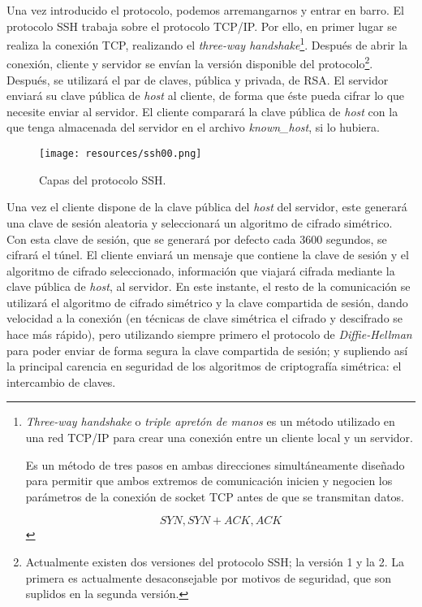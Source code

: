 \documentclass[a4paper, 11pt, titlepage]{article}
\begin{document}
    Una vez introducido el protocolo, podemos arremangarnos y entrar en barro. El protocolo 
    SSH trabaja sobre el protocolo TCP/IP. Por ello, en primer lugar se realiza la conexión 
    TCP, realizando el \textit{three-way handshake}\footnote{
        \textit{Three-way handshake} o \textit{triple apretón de manos} es un método 
        utilizado en una red TCP/IP para crear una conexión entre un cliente local y 
        un servidor.

        Es un método de tres pasos en ambas direcciones simultáneamente diseñado para 
        permitir que ambos extremos de comunicación inicien y negocien los parámetros 
        de la conexión de socket TCP antes de que se transmitan datos.

        \[SYN, SYN+ACK, ACK\]
    }. Después de abrir la conexión, cliente y servidor se envían la versión disponible 
    del protocolo\footnote{
        Actualmente existen dos versiones del protocolo SSH; la versión 1 y la 2. La primera 
        es actualmente desaconsejable por motivos de seguridad, que son suplidos en la segunda 
        versión.
    }. Después, se utilizará el par de claves, pública y privada, de RSA. El servidor enviará 
    su clave pública de \textit{host} al cliente, de forma que éste pueda cifrar lo que necesite 
    enviar al servidor. El cliente comparará la clave pública de \textit{host} con la que 
    tenga almacenada del servidor en el archivo \textit{known\_host}, si lo hubiera. 

    \begin{figure}[htp]
        \centering
        \texttt{[image: resources/ssh00.png]}
        \caption{Capas del protocolo SSH.}
        \label{ssh00}
    \end{figure}

    Una vez el cliente dispone de la clave pública del \textit{host} del servidor, este 
    generará una clave de sesión aleatoria y seleccionará un algoritmo de cifrado simétrico.
    Con esta clave de sesión, que se generará por defecto cada 3600 segundos, se cifrará el 
    túnel. El cliente enviará un mensaje que contiene la clave de sesión y el algoritmo de 
    cifrado seleccionado, información que viajará cifrada mediante la clave pública de \textit{host},
    al servidor. En este instante, el resto de la comunicación se utilizará el algoritmo de 
    cifrado simétrico y la clave compartida de sesión, dando velocidad a la conexión (en técnicas 
    de clave simétrica el cifrado y descifrado se hace más rápido), pero utilizando siempre 
    primero el protocolo de \textit{Diffie-Hellman} para poder enviar de forma segura 
    la clave compartida de sesión; y supliendo así la principal carencia en seguridad de los algoritmos 
    de criptografía simétrica: el intercambio de claves.
\end{document}
